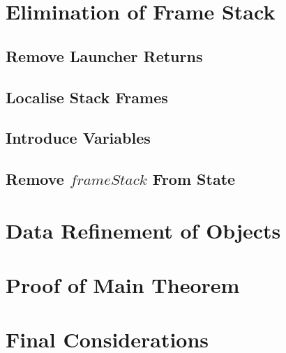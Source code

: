 

\section{Elimination of Frame Stack}
\label{elimination-of-frame-stack-section}



\subsection{Remove Launcher Returns}
\label{remove-launcher-returns-subsection}



\subsection{Localise Stack Frames}
\label{localise-stack-frames-subsection}



\subsection{Introduce Variables}
\label{introduce-variables-subsection}



\subsection{Remove \texorpdfstring{$frameStack$}{frameStack} From
  State}
\label{remove-frameStack-from-state-subsection}



\section{Data Refinement of Objects}
\label{data-refinement-of-objects-section}



\section{Proof of Main Theorem}
\label{main-theorem-proof-section}



\section{Final Considerations}
\label{compilation-final-considerations-section}